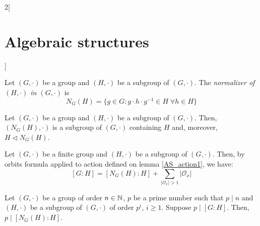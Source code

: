 \documentclass[../../../main.tex]{subfiles}
\begin{document}
\begin{multicols}{2}[\section{Algebraic structures}]
\begin{definition}
    Let $(G,\cdot)$ be a group and $(H,\cdot)$ be a subgroup of $(G,\cdot)$. The \textit{normalizer of $(H,\cdot)$ in $(G,\cdot)$} is $$N_G(H)=\{g\in G:g\cdot h\cdot g^{-1}\in H\;\forall h\in H\}$$
  \end{definition}
  \begin{lemma}
    Let $(G,\cdot)$ be a group and $(H,\cdot)$ be a subgroup of $(G,\cdot)$. Then, $(N_G(H),\cdot)$ is a subgroup of $(G,\cdot)$ containing $H$ and, moreover, $H\lhd N_G(H)$.
  \end{lemma}
  \begin{corollary}
    Let $(G,\cdot)$ be a finite group and $(H,\cdot)$ be a subgroup of $(G,\cdot)$. Then, by orbits formula applied to action defined on lemma \ref{AS_action1}, we have: $$[G:H]=[N_G(H):H]+\sum_{|\mathcal{O}_x|>1}|\mathcal{O}_x|$$
  \end{corollary}
  \begin{prop}
    Let $(G,\cdot)$ be a group of order $n\in\mathbb{N} $, $p$ be a prime number such that $p\mid n$ and $(H,\cdot)$ be a subgroup of $(G,\cdot)$ of order $p^i$, $i\geq 1$. Suppose $p\mid[G:H]$. Then, $p\mid[N_G(H):H]$.
  \end{prop}

\end{multicols}
\end{document}
